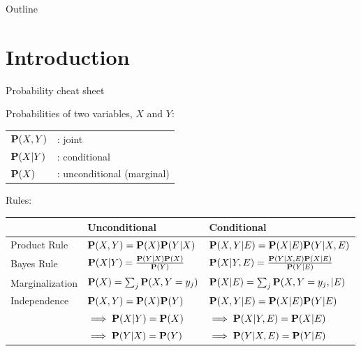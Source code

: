 \documentclass[compress, 8pt]{beamer}
\begin{document}
\miniframesoff
\begin{frame}{Outline}
    \tableofcontents
\end{frame}
\miniframeson



\section[Intro]{Introduction}

\begin{frame}{Probability cheat sheet}

Probabilities of two variables, $X$ and $Y$:
\begin{table}
\begin{tabular}{ll}
    $\mathbf{P} (X, Y)$ &: joint \\
    $\mathbf{P} (X \vert Y)$ &: conditional \\
    $\mathbf{P} (X)$ &: unconditional (marginal)
\end{tabular}
\end{table}
Rules:
\begin{table}
\begin{tabular}{lll}
&Unconditional &Conditional \\
\hline
Product Rule 
& $\mathbf{P} (X, Y) = \mathbf{P} (X) \mathbf{P} (Y \vert X)$ 
& $\mathbf{P} (X, Y \vert E) = \mathbf{P}(X \vert E) \mathbf{P} (Y \vert X, E)$ \\
Bayes Rule 
& $\mathbf{P} (X \vert Y) = \frac{\mathbf{P}(Y \vert X) \mathbf{P}(X)}{\mathbf{P} (Y)}$
& $\mathbf{P} (X \vert Y, E) = \frac{\mathbf{P} (Y \vert X, E) \mathbf{P}(X \vert E)}{\mathbf{P}(Y \vert E)}$
\\
Marginalization 
& $\mathbf{P}(X) = \sum_j \mathbf{P}(X, Y=y_j)$
& $\mathbf{P}(X \vert E) = \sum_j \mathbf{P}(X, Y=y_j, \vert E)$
\\
\hline
Independence
& $\mathbf{P}(X, Y) = \mathbf{P}(X)\mathbf{P}(Y)$
& $\mathbf{P}(X, Y \vert E) = \mathbf{P} (X \vert E) \mathbf{P}(Y \vert E)$ \\
& $\implies \mathbf{P}(X \vert Y) = \mathbf{P}(X)$
& $\implies \mathbf{P}(X \vert Y, E) = \mathbf{P}(X \vert E)$ \\
& $\implies \mathbf{P}(Y \vert X) = \mathbf{P}(Y)$
& $\implies\mathbf{P}(Y \vert X, E) = \mathbf{P}(Y \vert E)$ \\
\end{tabular}
\end{table}

\end{frame}
\end{document}
